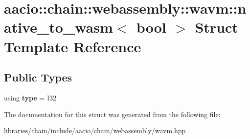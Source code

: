 \hypertarget{structaacio_1_1chain_1_1webassembly_1_1wavm_1_1native__to__wasm_3_01bool_01_4}{}\section{aacio\+:\+:chain\+:\+:webassembly\+:\+:wavm\+:\+:native\+\_\+to\+\_\+wasm$<$ bool $>$ Struct Template Reference}
\label{structaacio_1_1chain_1_1webassembly_1_1wavm_1_1native__to__wasm_3_01bool_01_4}
\subsection*{Public Types}
\begin{DoxyCompactItemize}
\item 
\mbox{\label{structaacio_1_1chain_1_1webassembly_1_1wavm_1_1native__to__wasm_3_01bool_01_4_a1badaea517e550b55ebc6d836a49464e}} 
using {\bfseries type} = I32
\end{DoxyCompactItemize}


The documentation for this struct was generated from the following file\+:\begin{DoxyCompactItemize}
\item 
libraries/chain/include/aacio/chain/webassembly/wavm.\+hpp\end{DoxyCompactItemize}

